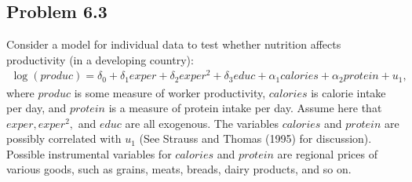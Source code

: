 \documentclass[10pt]{article}
\begin{document}
\subsection*{Problem 6.3}
Consider a model for individual data to test whether nutrition affects productivity (in a developing country):
\begin{align}
    \log(produc)=\delta_0+\delta_1exper+\delta_2exper^2+\delta_3educ+\alpha_1calories+\alpha_2protein+u_1, \tag{6.57} \label{(6.57)}
\end{align}
where $produc$ is some measure of worker productivity, $calories$ is calorie intake per day, and $protein$ is a measure of protein intake per day. Assume here that $exper,exper^2,$ and $educ$ are all exogenous. The variables $calories$ and $protein$ are possibly correlated with $u_1$ (See Strauss and Thomas (1995) for discussion). Possible instrumental variables for $calories$ and $protein$ are regional prices of various goods, such as grains, meats, breads, dairy products, and so on.
\end{document}
